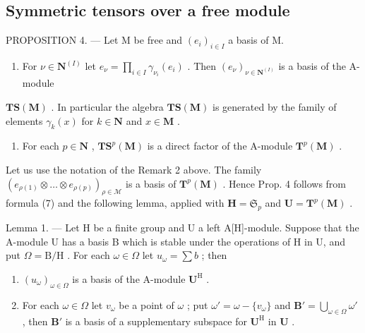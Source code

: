 \subsection{Symmetric tensors over a free module}

PROPOSITION 4. --- Let M be free and \((e_{i})_{i\in I}\) a basis of M.

\begin{enumerate}
\def\labelenumi{(\roman{enumi})}
\tightlist
\item
  For \(\nu \in \mathbf{N}^{(I)}\) let \(e_{\nu} = \prod_{i\in I}\gamma_{\nu_i}(e_i)\) . Then \((e_{\nu})_{\nu \in \mathbf{N}^{(I)}}\) is a basis of the A-module
\end{enumerate}

\(\mathbf{TS}(\mathbf{M})\) . In particular the algebra \(\mathbf{TS}(\mathbf{M})\) is generated by the family of elements \(\gamma_k(x)\) for \(k \in \mathbf{N}\) and \(x \in \mathbf{M}\) .

\begin{enumerate}
\def\labelenumi{(\roman{enumi})}
\setcounter{enumi}{1}
\tightlist
\item
  For each \(p \in \mathbf{N}\) , \(\mathbf{T}\mathbf{S}^p(\mathbf{M})\) is a direct factor of the A-module \(\mathbf{T}^p(\mathbf{M})\) .
\end{enumerate}

Let us use the notation of the Remark 2 above. The family \((e_{\rho(1)} \otimes \ldots \otimes e_{\rho(p)})_{\rho \in \mathcal{M}}\) is a basis of \(\mathbf{T}^p(\mathbf{M})\) . Hence Prop. 4 follows from formula (7) and the following lemma, applied with \(\mathbf{H} = \mathfrak{S}_p\) and \(\mathbf{U} = \mathbf{T}^p(\mathbf{M})\) .

Lemma 1. --- Let H be a finite group and U a left A{[}H{]}-module. Suppose that the A-module U has a basis B which is stable under the operations of H in U, and put \(\Omega = \mathrm{B} / \mathrm{H}\) . For each \(\omega \in \Omega\) let \(u_{\omega} = \sum b\) ; then

\begin{enumerate}
\def\labelenumi{(\roman{enumi})}
\item
  \((u_{\omega})_{\omega \in \Omega}\) is a basis of the A-module \(\mathbf{U}^{\mathrm{H}}\) .
\item
  For each \(\omega \in \Omega\) let \(v_{\omega}\) be a point of \(\omega\) ; put \(\omega' = \omega - \{v_{\omega}\}\) and \(\mathbf{B}' = \bigcup_{\omega \in \Omega} \omega'\) , then \(\mathbf{B}'\) is a basis of a supplementary subspace for \(\mathbf{U}^{\mathrm{H}}\) in \(\mathbf{U}\) .
\end{enumerate}

